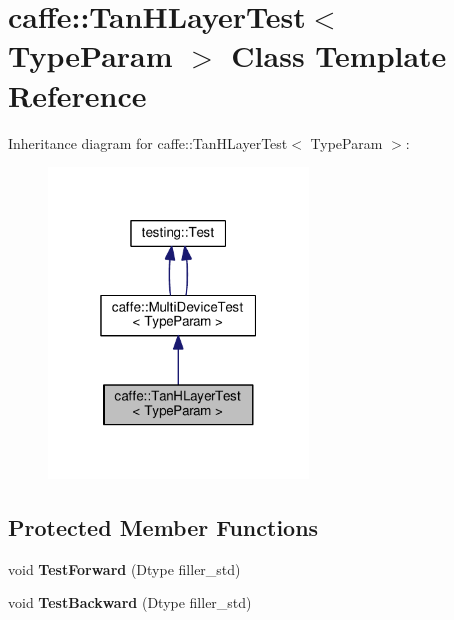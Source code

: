 \hypertarget{classcaffe_1_1_tan_h_layer_test}{}\section{caffe\+:\+:Tan\+H\+Layer\+Test$<$ Type\+Param $>$ Class Template Reference}
\label{classcaffe_1_1_tan_h_layer_test}


Inheritance diagram for caffe\+:\+:Tan\+H\+Layer\+Test$<$ Type\+Param $>$\+:
\nopagebreak
\begin{figure}[H]
\begin{center}
\leavevmode
\includegraphics[width=196pt]{classcaffe_1_1_tan_h_layer_test__inherit__graph}
\end{center}
\end{figure}
\subsection*{Protected Member Functions}
\begin{DoxyCompactItemize}
\item 
\mbox{\label{classcaffe_1_1_tan_h_layer_test_a8d0ba4fb246edd4a3193e65aee7132a5}} 
void {\bfseries Test\+Forward} (Dtype filler\+\_\+std)
\item 
\mbox{\label{classcaffe_1_1_tan_h_layer_test_a7918de2276f80143b7178e41bcc946d2}} 
void {\bfseries Test\+Backward} (Dtype filler\+\_\+std)
\end{DoxyCompactItemize}
